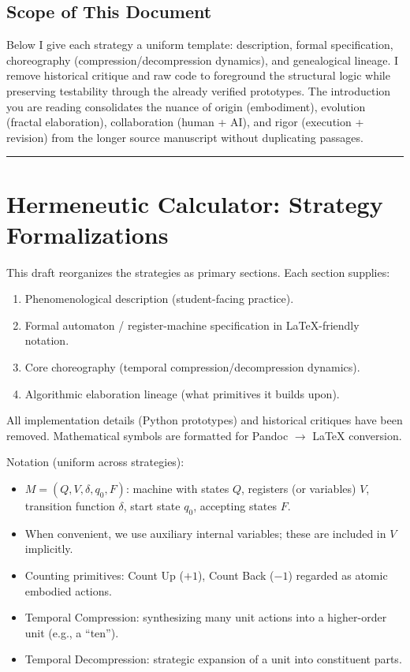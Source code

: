 \documentclass[
]{article}
\providecommand{\tightlist}{%
  \setlength{\itemsep}{0pt}\setlength{\parskip}{0pt}}
\begin{document}
\subsection{Scope of This Document}\label{scope-of-this-document}

Below I give each strategy a uniform template: description, formal
specification, choreography (compression/decompression dynamics), and
genealogical lineage. I remove historical critique and raw code to
foreground the structural logic while preserving testability through the
already verified prototypes. The introduction you are reading
consolidates the nuance of origin (embodiment), evolution (fractal
elaboration), collaboration (human + AI), and rigor (execution +
revision) from the longer source manuscript without duplicating
passages.

\begin{center}\rule{0.5\linewidth}{0.5pt}\end{center}

\section{Hermeneutic Calculator: Strategy
Formalizations}\label{hermeneutic-calculator-strategy-formalizations}

This draft reorganizes the strategies as primary sections. Each section
supplies:

\begin{enumerate}
\def\labelenumi{\arabic{enumi}.}
\tightlist
\item
  Phenomenological description (student-facing practice).
\item
  Formal automaton / register-machine specification in LaTeX-friendly
  notation.
\item
  Core choreography (temporal compression/decompression dynamics).
\item
  Algorithmic elaboration lineage (what primitives it builds upon).
\end{enumerate}

All implementation details (Python prototypes) and historical critiques
have been removed. Mathematical symbols are formatted for Pandoc \(\to\)
LaTeX conversion.

Notation (uniform across strategies):

\begin{itemize}
\tightlist
\item
  \(M = (Q, V, \delta, q_0, F)\): machine with states \(Q\), registers
  (or variables) \(V\), transition function \(\delta\), start state
  \(q_0\), accepting states \(F\).
\item
  When convenient, we use auxiliary internal variables; these are
  included in \(V\) implicitly.
\item
  Counting primitives: Count Up (\(+1\)), Count Back (\(-1\)) regarded
  as atomic embodied actions.
\item
  Temporal Compression: synthesizing many unit actions into a
  higher-order unit (e.g., a ``ten'').
\item
  Temporal Decompression: strategic expansion of a unit into constituent
  parts.
\end{itemize}
\end{document}
